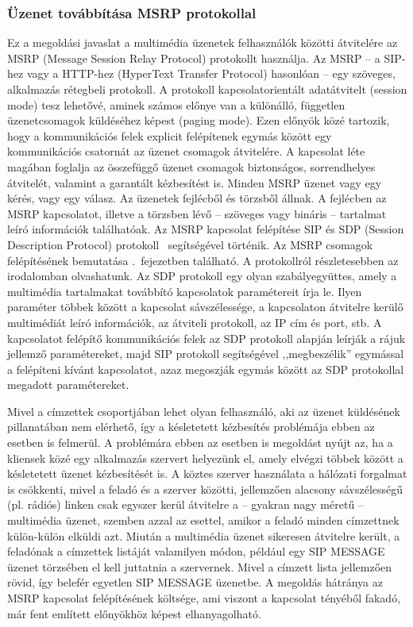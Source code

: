 \subsubsection{Üzenet továbbítása MSRP protokollal}
\label{sec:msrp_message}

Ez a megoldási javaslat a multimédia üzenetek felhasználók közötti átvitelére az MSRP (Message Session Relay Protocol) protokollt használja. Az MSRP -- a SIP-hez vagy a HTTP-hez (HyperText Transfer Protocol) hasonlóan -- egy szöveges, alkalmazás rétegbeli protokoll. A protokoll kapcsolatorientált adatátvitelt (session mode) tesz lehetővé, aminek számos előnye van a különálló, független üzenetcsomagok küldéséhez képest (paging mode).
Ezen előnyök közé tartozik, hogy a kommunikációs felek explicit felépítenek egymás között egy kommunikációs csatornát az üzenet csomagok átvitelére. A kapcsolat léte magában foglalja az összefüggő üzenet csomagok biztonságos, sorrendhelyes átvitelét, valamint a garantált kézbesítést is. Minden MSRP üzenet vagy egy kérés, vagy egy válasz. Az üzenetek fejlécből és törzsből állnak. A fejlécben az MSRP kapcsolatot, illetve a törzsben lévő -- szöveges vagy bináris -- tartalmat leíró információk találhatóak. Az MSRP kapcsolat felépítése SIP és SDP (Session Description Protocol) protokoll~\cite{rfc4566} segítségével történik. Az MSRP csomagok felépítésének bemutatása .~fejezetben található. A protokollról részletesebben az~\cite{rfc4975} irodalomban olvashatunk. Az SDP protokoll egy olyan szabályegyüttes, amely a multimédia tartalmakat továbbító kapcsolatok paramétereit írja le. Ilyen paraméter többek között a kapcsolat sávszélessége, a kapcsolaton átvitelre kerülő multimédiát leíró információk, az átviteli protokoll, az IP cím és port, stb. A kapcsolatot felépítő kommunikációs felek az SDP protokoll alapján leírják a rájuk jellemző paramétereket, majd SIP protokoll segítségével ,,megbeszélik'' egymással a felépíteni kívánt kapcsolatot, azaz megoszják egymás között az SDP protokollal megadott paramétereket. 

Mivel a címzettek csoportjában lehet olyan felhasználó, aki az üzenet küldésének pillanatában nem elérhető, így a késletetett kézbesítés problémája ebben az esetben is felmerül. A problémára ebben az esetben is megoldást nyújt az, ha a kliensek közé egy alkalmazás szervert helyezünk el, amely elvégzi többek között a késletetett üzenet kézbesítését is. A köztes szerver használata a hálózati forgalmat is csökkenti, mivel a feladó és a szerver közötti, jellemzően alacsony sávszélességű (pl. rádiós) linken csak egyszer kerül átvitelre a -- gyakran nagy méretű -- multimédia üzenet, szemben azzal az esettel, amikor a feladó minden címzettnek külön-külön elküldi azt. Miután a multimédia üzenet sikeresen átvitelre került, a feladónak a címzettek listáját valamilyen módon, például egy SIP MESSAGE üzenet törzsében el kell juttatnia a szervernek. Mivel a címzett lista jellemzően rövid, így belefér egyetlen SIP MESSAGE üzenetbe. A megoldás hátránya az MSRP kapcsolat felépítésének költsége, ami viszont a kapcsolat tényéből fakadó, már fent említett előnyökhöz képest elhanyagolható.

